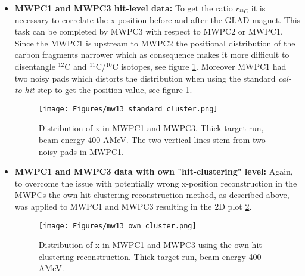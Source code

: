 \begin{itemize}
\item \textbf{MWPC1 and MWPC3 hit-level data:}\newline
To get the ratio ${r_{^{12}C}}$ it is necessary to correlate the x position before and after the GLAD magnet. This task can be completed by MWPC3 with respect to MWPC2 or MWPC1. Since the MWPC1 is upstream to MWPC2 the positional distribution of the carbon fragments narrower which as consequence makes it more difficult to disentangle $^{12}$C and $^{11}$C/$^{10}$C isotopes, see figure \ref{fig:mw13_standard_cluster}. Moreover MWPC1 had two noisy pads which distorts the distribution when using the standard  \textit{cal-to-hit} step to get the position value, see figure \ref{fig:mw13_standard_cluster}.
\begin{figure}[htpb]
    \centering
    \texttt{[image: Figures/mw13\_standard\_cluster.png]}
    \caption{
   	 Distribution of x in MWPC1 and MWPC3. Thick target run, beam energy 400 AMeV. The two vertical lines stem from two noisy pads in MWPC1. 
     }
    \label{fig:mw13_standard_cluster}
\end{figure}
\item \textbf{MWPC1 and MWPC3 data with own "hit-clustering" level:}\newline
Again, to overcome the issue with potentially wrong x-position reconstruction in the MWPCs the own hit clustering reconstruction method, as described above, was applied to MWPC1 and MWPC3 resulting in the 2D plot \ref{fig:mw13_own_cluster}.
\begin{figure}[htpb]
    \centering
    \texttt{[image: Figures/mw13\_own\_cluster.png]}
    \caption{
   	 Distribution of x in MWPC1 and MWPC3 using the own hit clustering reconstruction. Thick target run, beam energy 400 AMeV. 
     }
    \label{fig:mw13_own_cluster}
\end{figure}


\end{itemize}
